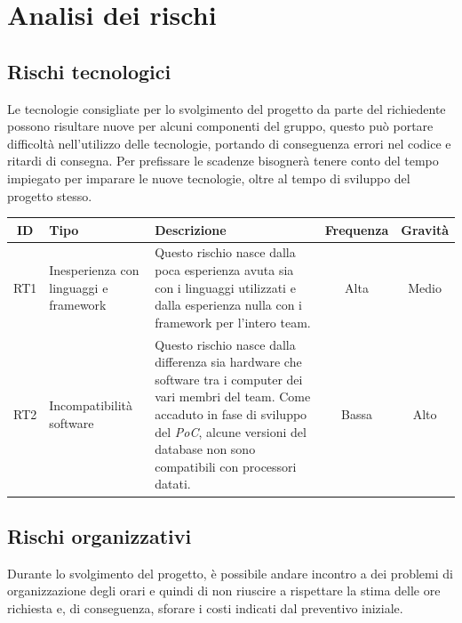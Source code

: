 \documentclass[a4paper, 12pt]{article}
\begin{document}
\makeindexdetails
\makefrontpage \makeversioni
\tableofcontents
\newpage


\section{Analisi dei rischi}

\subsection{Rischi tecnologici}
Le tecnologie consigliate per lo svolgimento del progetto da parte del richiedente possono risultare nuove per alcuni componenti del gruppo, questo può portare difficoltà nell'utilizzo delle tecnologie, portando di conseguenza errori nel codice e ritardi di consegna. \newline
Per prefissare le scadenze bisognerà tenere conto del tempo impiegato per imparare le nuove tecnologie, oltre al tempo di sviluppo del progetto stesso.

\begin{center}
	\begin{tabularx}{\textwidth}{||c|X|X|c|c||}
		\hline
		\textbf{ID} & \textbf{Tipo}                          & \textbf{Descrizione}                                                                                                                                                                                                                  & \textbf{Frequenza} & \textbf{Gravità} \\
		\hline \hline
		RT1         & Inesperienza con linguaggi e framework & Questo rischio nasce dalla poca esperienza avuta sia con i linguaggi utilizzati e dalla esperienza nulla con i framework per l'intero team.                                                                                           & Alta               & Medio            \\
		\hline
		RT2         & Incompatibilità software               & Questo rischio nasce dalla differenza sia hardware che software tra i computer dei vari membri del team. Come accaduto in fase di sviluppo del \textit{PoC}, alcune versioni del database non sono compatibili con processori datati. & Bassa              & Alto             \\
		\hline \hline
	\end{tabularx}
\end{center}

\subsection{Rischi organizzativi}
Durante lo svolgimento del progetto, è possibile andare incontro a dei problemi di organizzazione degli orari e quindi di non riuscire a rispettare la stima delle ore richiesta e, di conseguenza, sforare i costi indicati dal preventivo iniziale.
\end{document}

